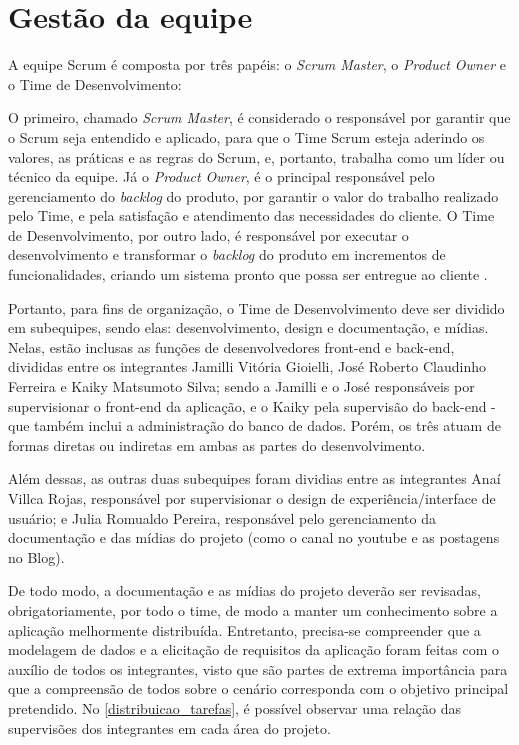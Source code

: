 \section{Gestão da equipe}
A equipe Scrum é composta por três papéis: o \textsl{Scrum Master}, o \textsl{Product Owner} e o Time de Desenvolvimento:

\begin{citacao}
O primeiro, chamado \textsl{Scrum Master}, é considerado o responsável por garantir que o Scrum seja entendido e aplicado, para que o Time Scrum esteja aderindo os valores, as práticas e as regras do Scrum, e, portanto, trabalha como um líder ou técnico da equipe. Já o \textsl{Product Owner}, é o principal responsável pelo gerenciamento do \textsl{backlog} do produto, por garantir o valor do trabalho realizado pelo Time, e pela satisfação e atendimento das necessidades do cliente. O Time de Desenvolvimento, por outro lado, é responsável por executar o desenvolvimento e transformar o \textsl{backlog} do produto em incrementos de funcionalidades, criando um sistema pronto que possa ser entregue ao cliente \cite{cruz:2018}.
\end{citacao}

Portanto, para fins de organização, o Time de Desenvolvimento deve ser dividido em subequipes, sendo elas: desenvolvimento, design e documentação, e mídias. Nelas, estão inclusas as funções de desenvolvedores \gls{front-end} e \gls{back-end}, divididas entre os integrantes Jamilli Vitória Gioielli, José Roberto Claudinho Ferreira e Kaiky Matsumoto Silva; sendo a Jamilli e o José responsáveis por supervisionar o \gls{front-end} da aplicação, e o Kaiky pela supervisão do \gls{back-end} - que também inclui a administração do banco de dados. Porém, os três atuam de formas diretas ou indiretas em ambas as partes do desenvolvimento.

Além dessas, as outras duas subequipes foram dividias entre as integrantes Anaí Villca Rojas, responsável  por supervisionar o design de experiência/interface de usuário; e Julia Romualdo Pereira, responsável pelo gerenciamento da documentação e das mídias do projeto (como o canal no \gls{youtube} e as postagens no Blog). 

De todo modo, a documentação e as mídias do projeto deverão ser revisadas, obrigatoriamente, por todo o time, de modo a manter um conhecimento sobre a aplicação melhormente distribuída. Entretanto, precisa-se compreender que a modelagem de dados e a elicitação de requisitos da aplicação foram feitas com o auxílio de todos os integrantes, visto que são partes de extrema importância para que a compreensão de todos sobre o cenário corresponda com o objetivo principal pretendido. No \autoref{distribuicao_tarefas}, é possível observar uma relação das supervisões dos integrantes em cada área do projeto. 

